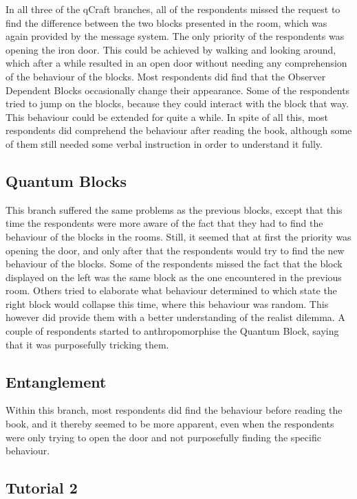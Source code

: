 \documentclass[11pt,twoside]{report} %
\begin{document}
In all three of the qCraft branches, all of the respondents missed the request to find the difference between the two blocks presented in the room, which was again provided by the message system. The only priority of the respondents was opening the iron door. This could be achieved by walking and looking around, which after a while resulted in an open door without needing any comprehension of the behaviour of the blocks. Most respondents did find that the Observer Dependent Blocks occasionally change their appearance. Some of the respondents tried to jump on the blocks, because they could interact with the block that way. This behaviour could be extended for quite a while. In spite of all this, most respondents did comprehend the behaviour after reading the book, although some of them still needed some verbal instruction in order to understand it fully.

\subsection{Quantum Blocks}

This branch suffered the same problems as the previous blocks, except that this time the respondents were more aware of the fact that they had to find the behaviour of the blocks in the rooms. Still, it seemed that at first the priority was opening the door, and only after that the respondents would try to find the new behaviour of the blocks. Some of the respondents missed the fact that the block displayed on the left was the same block as the one encountered in the previous room. Others tried to elaborate what behaviour determined to which state the right block would collapse this time, where this behaviour was random. This however did provide them with a better understanding of the realist dilemma. A couple of respondents started to anthropomorphise the Quantum Block, saying that it was purposefully tricking them.

\subsection{Entanglement}

Within this branch, most respondents did find the behaviour before reading the book, and it thereby seemed to be more apparent, even when the respondents were only trying to open the door and not purposefully finding the specific behaviour.

\subsection{Tutorial 2}
\end{document}
